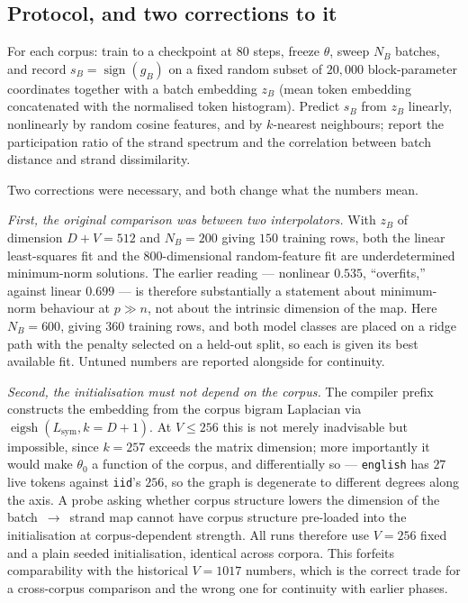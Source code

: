\subsection{Protocol, and two corrections to it}
\label{sec:idprobe-protocol}

For each corpus: train to a checkpoint at $80$ steps, freeze $\theta$, sweep
$N_B$ batches, and record $s_B=\operatorname{sign}(g_B)$ on a fixed random
subset of $20{,}000$ block-parameter coordinates together with a batch
embedding $z_B$ (mean token embedding concatenated with the normalised token
histogram). Predict $s_B$ from $z_B$ linearly, nonlinearly by random cosine
features, and by $k$-nearest neighbours; report the participation ratio of the
strand spectrum and the correlation between batch distance and strand
dissimilarity.

Two corrections were necessary, and both change what the numbers mean.

\emph{First, the original comparison was between two interpolators.} With
$z_B$ of dimension $D+V=512$ and $N_B=200$ giving $150$ training rows, both the
linear least-squares fit and the $800$-dimensional random-feature fit are
underdetermined minimum-norm solutions. The earlier reading --- nonlinear
$0.535$, ``overfits,'' against linear $0.699$ --- is therefore substantially a
statement about minimum-norm behaviour at $p \gg n$, not about the intrinsic
dimension of the map. Here $N_B=600$, giving $360$ training rows, and both
model classes are placed on a ridge path with the penalty selected on a
held-out split, so each is given its best available fit. Untuned numbers are
reported alongside for continuity.

\emph{Second, the initialisation must not depend on the corpus.} The
compiler prefix constructs the embedding from the corpus bigram Laplacian via
$\operatorname{eigsh}(L_{\mathrm{sym}},k=D{+}1)$. At $V\le 256$ this is not
merely inadvisable but impossible, since $k=257$ exceeds the matrix dimension;
more importantly it would make $\theta_0$ a function of the corpus, and
differentially so --- \texttt{english} has $27$ live tokens against
\texttt{iid}'s $256$, so the graph is degenerate to different degrees along the
axis. A probe asking whether corpus structure lowers the dimension of the
batch~$\to$~strand map cannot have corpus structure pre-loaded into the
initialisation at corpus-dependent strength. All runs therefore use $V=256$
fixed and a plain seeded initialisation, identical across corpora. This
forfeits comparability with the historical $V=1017$ numbers, which is the
correct trade for a cross-corpus comparison and the wrong one for continuity
with earlier phases.

